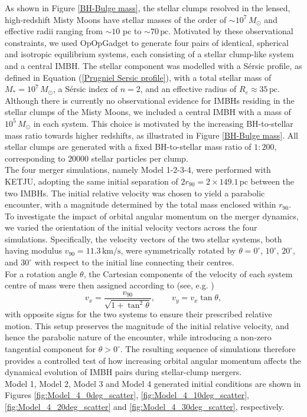 \documentclass[12pt,twoside,openany]{book}
\begin{document}
As shown in Figure \ref{BH-Bulge mass}, the stellar clumps resolved in the lensed, high-redshift Misty Moons have stellar masses of the order of $\sim 10^7\,M_\odot$ and effective radii ranging from $\sim 10$ pc to $\sim 70\,\mathrm{pc}$. Motivated by these observational constraints, we used OpOpGadget to generate four pairs of identical, spherical and isotropic equilibrium systems, each consisting of a stellar clump-like system and a central IMBH. The stellar component was modelled with a Sérsic profile, as defined in Equation (\ref{Prugniel Sersic profile}), with a total stellar mass of $M_*=10^7\,M_\odot$, a Sérsic index of $n=2$, and an effective radius of $R_e\approx 35\,\mathrm{pc}$. Although there is currently no observational evidence for IMBHs residing in the stellar clumps of the Misty Moons, we included a central IMBH with a mass of $10^5\,M_\odot$ in each system. This choice is motivated by the increasing BH-to-stellar mass ratio towards higher redshifts, as illustrated in Figure \ref{BH-Bulge mass}. All stellar clumps are generated with a fixed BH-to-stellar mass ratio of $1:200$, corresponding to $20000$ stellar particles per clump.\\The four merger simulations, namely Model 1-2-3-4, were performed with KETJU, adopting the same initial separation of $2r_{90}=2\times149.1\,\mathrm{pc}$ between the two IMBHs. The initial relative velocity was chosen to yield a parabolic encounter, with a magnitude determined by the total mass enclosed within $r_{90}$. To investigate the impact of orbital angular momentum on the merger dynamics, we varied the orientation of the initial velocity vectors across the four simulations. Specifically, the velocity vectors of the two stellar systems, both having modulus $v_{90}=11.3\,\mathrm{km/s}$, were symmetrically rotated by $\theta=0^\circ$, $10^\circ$, $20^\circ$, and $30^\circ$ with respect to the initial line connecting their centres.\\For a rotation angle $\theta$, the Cartesian components of the velocity of each system centre of mass were then assigned according to (see, e.g. \citealt{Nipoti_Londrillo_2007})
\begin{equation}
v_x = \frac{v_{90}}{\sqrt{1+\tan^2\theta}},
\qquad
v_y = v_x\tan\theta,
\end{equation}
with opposite signs for the two systems to ensure their prescribed relative motion. This setup preserves the magnitude of the initial relative velocity, and hence the parabolic nature of the encounter, while introducing a non-zero tangential component for $\theta>0^\circ$. The resulting sequence of simulations therefore provides a controlled test of how increasing orbital angular momentum affects the dynamical evolution of IMBH pairs during stellar-clump mergers.\\Model 1, Model 2, Model 3 and Model 4 generated initial conditions are shown in Figures \ref{fig:Model_4_0deg_scatter}, \ref{fig:Model_4_10deg_scatter}, \ref{fig:Model_4_20deg_scatter} and \ref{fig:Model_4_30deg_scatter}, respectively.
\end{document}
